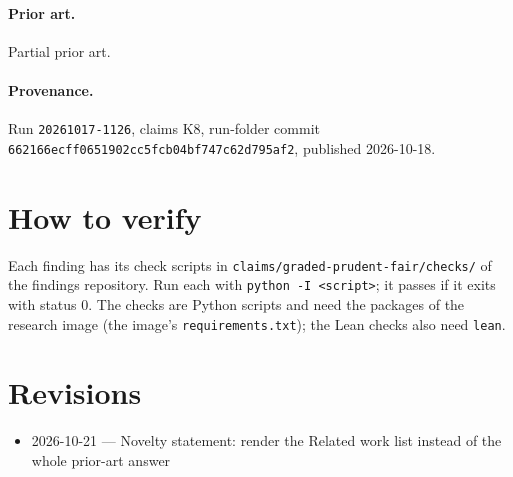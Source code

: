 \documentclass{article}
\begin{document}
\paragraph{Prior art.} Partial prior art.

\paragraph{Provenance.}
Run \texttt{20261017-1126}, claims K8, run-folder commit \texttt{662166ecff0651902cc5fcb04bf747c62d795af2}, published 2026-10-18.

\section{How to verify}

Each finding has its check scripts in \texttt{claims/graded-prudent-fair/checks/} of the findings repository. Run each with \texttt{python -I <script>}; it passes if it exits with status 0. The checks are Python scripts and need the packages of the research image (the image's \texttt{requirements.txt}); the Lean checks also need \texttt{lean}.

\section{Revisions}

\begin{itemize}
\item 2026-10-21 --- Novelty statement: render the Related work list instead of the whole prior-art answer
\end{itemize}



\end{document}
